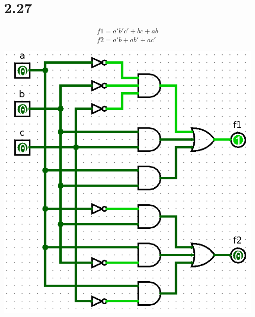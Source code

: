\documentclass{article}
\begin{document}
\section*{2.27}
\begin{align*}
    f1=a'b'c'+bc+ab\\
    f2=a'b+ab'+ac'
\end{align*}
\begin{center}
    \includegraphics[scale=0.5]{imgs/ras.png}
\end{center}
\end{document}
